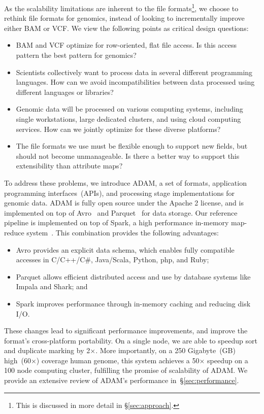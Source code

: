 \documentclass{bioinfo}
\begin{document}
As the scalability limitations are inherent to the file formats\footnote{This is discussed in more detail in \S\ref{sec:approach}.}, we
choose to rethink file formats for genomics, instead of looking to incrementally improve either BAM or VCF. We view the following
points as critical design questions:

\begin{itemize}
\item BAM and VCF optimize for row-oriented, flat file access. Is this access pattern the best pattern for genomics?
\item Scientists collectively want to process data in several different programming languages. How can we avoid incompatibilities between
data processed using different languages or libraries?
\item Genomic data will be processed on various computing systems, including single workstations, large dedicated clusters,
and using cloud computing services. How can we jointly optimize for these diverse platforms?
\item The file formats we use must be flexible enough to support new fields, but should not become unmanageable. Is there a better
way to support this extensibility than attribute maps?
\end{itemize}

To address these problems, we introduce ADAM, a set of formats, application programming interfaces~(APIs), and processing stage
implementations for genomic data. ADAM is fully open source under the Apache 2 license, and is implemented on top of Avro~\citep{avro}
and Parquet~\citep{parquet} for data storage. Our reference pipeline is implemented on top of Spark, a high performance in-memory map-reduce
system~\citep{zaharia10}. This combination provides the following advantages:

\begin{itemize}
\item Avro provides an explicit data schema, which enables fully compatible accesses in C/C++/C\#, Java/Scala, Python, php, and Ruby;
\item Parquet allows efficient distributed access and use by database systems like Impala and Shark; and 
\item Spark improves performance through in-memory caching and reducing disk I/O.
\end{itemize}

These changes lead to significant performance improvements, and improve the format's cross-platform portability. On a single
node, we are able to speedup sort and duplicate marking by 2$\times$. More importantly, on a 250 Gigabyte~(GB) high~(60$\times$) coverage
human genome, this system achieves a 50$\times$ speedup on a 100 node computing cluster, fulfilling the promise of scalability of ADAM.
We provide an extensive review of ADAM's performance in~\S\ref{sec:performance}.
\end{document}

